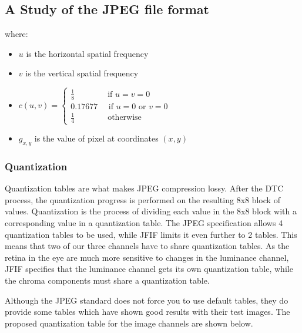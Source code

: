 \begin{infobox}{\section[A Study of the JPEG file format]{A Study of the JPEG file format}}
where:
\begin{itemize}
	\item $u$ is the horizontal spatial frequency 
	\item $v$ is the vertical spatial frequency 
	\item $c(u,v) = \begin{cases}\frac{1}{8} \quad \quad \quad \quad\text{if } u=v=0\\ 
	                             0.17677 \quad \text{ if } u = 0 \text{ or } v = 0\\
	                             \frac{1}{4} \quad \quad \quad \quad\text{otherwise}
	                             \end{cases} $
    \item $g_{x,y}$ is the value of pixel at coordinates $(x,y)$ 
\end{itemize}

\subsubsection*{Quantization}
Quantization tables are what makes JPEG compression lossy. 
After the DTC process, the quantization progress is performed on the resulting 8x8 block of values.  
Quantization is the process of dividing each value in the 8x8 block with a corresponding value in a quantization table. 
The JPEG specification allows 4 quantization tables to be used, while JFIF limits it even further to 2 tables. 
This means that two of our three channels have to share quantization tables. 
As the retina in the eye are much more sensitive to changes in the luminance channel, JFIF specifies that the luminance channel gets its own quantization table, while the chroma components must share a quantization table.

Although the JPEG standard does not force you to use default tables, they do provide some tables which have shown good results with their test images. The proposed quantization table for the image channels are shown below.


\end{infobox}

